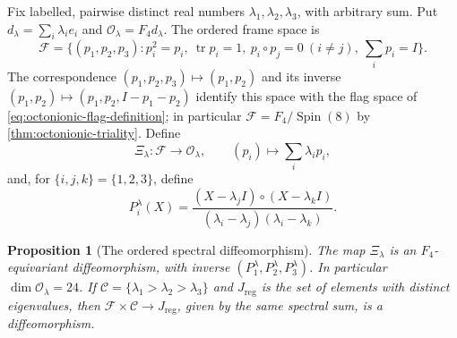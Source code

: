 \documentclass[11pt]{article}
\newtheorem{proposition}[theorem]{Proposition}
\theoremstyle{definition}
\begin{document}
Fix labelled, pairwise distinct real numbers
$\lambda_1,\lambda_2,\lambda_3$, with arbitrary sum. Put
$d_\lambda=\sum_i\lambda_i e_i$ and
$\mathcal O_\lambda=F_4d_\lambda$. The ordered frame space is
\[
 \mathcal F=\{(p_1,p_2,p_3):p_i^2=p_i,\
 \operatorname{tr}p_i=1,\ p_i\circ p_j=0\ (i\ne j),\
 \textstyle\sum_i p_i=I\}.
\]
The correspondence $(p_1,p_2,p_3)\mapsto(p_1,p_2)$ and its inverse
$(p_1,p_2)\mapsto(p_1,p_2,I-p_1-p_2)$ identify this space with the
flag space of \eqref{eq:octonionic-flag-definition}; in particular
$\mathcal F=F_4/\operatorname{Spin}(8)$ by
\cref{thm:octonionic-triality}. Define
\begin{equation}
 \Xi_\lambda:\mathcal F\longrightarrow\mathcal O_\lambda,
 \qquad (p_i)\longmapsto\sum_i\lambda_i p_i,
 \label{ocb:eq:orbit-map}\tag{OCB7}
\end{equation}
and, for $\{i,j,k\}=\{1,2,3\}$, define
\begin{equation}
 P_i^\lambda(X)=
 \frac{(X-\lambda_jI)\circ(X-\lambda_kI)}
      {(\lambda_i-\lambda_j)(\lambda_i-\lambda_k)}.
 \label{ocb:eq:projectors}\tag{OCB8}
\end{equation}

\begin{proposition}[The ordered spectral diffeomorphism]
\label{ocb:prop:spectral-diffeomorphism}
The map $\Xi_\lambda$ is an $F_4$-equivariant diffeomorphism, with
inverse $(P_1^\lambda,P_2^\lambda,P_3^\lambda)$. In particular
$\dim\mathcal O_\lambda=24$. If
$\mathcal C=\{\lambda_1>\lambda_2>\lambda_3\}$ and
$J_{\mathrm{reg}}$ is the set of elements with distinct eigenvalues,
then $\mathcal F\times\mathcal C\to J_{\mathrm{reg}}$, given by the
same spectral sum, is a diffeomorphism.
\end{proposition}
\end{document}
